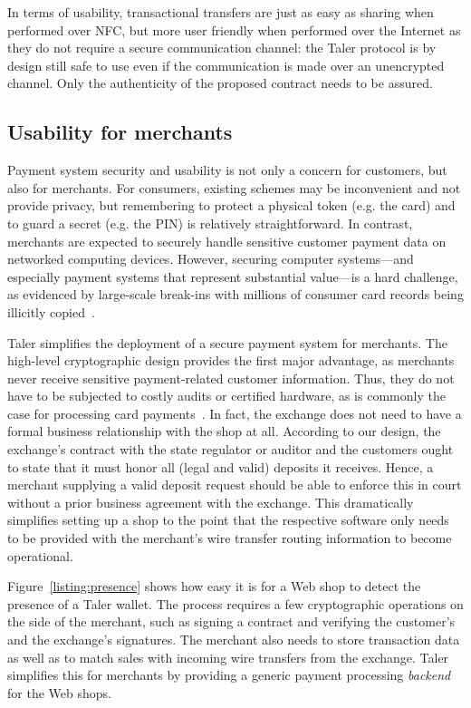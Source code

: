 \documentclass{llncs}
\begin{document}
In terms of usability, transactional
transfers are just as easy as sharing when performed over NFC, but
more user friendly when performed over the Internet as they do not
require a secure communication channel: the Taler protocol is by
design still safe to use even if the communication is made over an
unencrypted channel. Only the authenticity of the proposed contract
needs to be assured.


\subsection{Usability for merchants}

Payment system security and usability is not only a concern for
customers, but also for merchants.  For consumers, existing schemes
may be inconvenient and not provide privacy, but remembering to
protect a physical token (e.g. the card) and to guard a secret
(e.g. the PIN) is relatively straightforward.  In contrast, merchants
are expected to securely handle sensitive customer payment data on
networked computing devices.  However, securing computer systems---and
especially payment systems that represent substantial value---is a
hard challenge, as evidenced by large-scale break-ins with millions of
consumer card records being illicitly copied~\cite{target}.

Taler simplifies the deployment of a secure payment system for
merchants. The high-level cryptographic design
provides the first major advantage, as merchants never
receive sensitive payment-related customer information.  Thus, they do
not have to be subjected to costly audits or certified hardware, as is
commonly the case for processing card payments~\cite{pcidss}. In fact,
the exchange does not need to have a formal business relationship with
the shop at all.  According to our design, the exchange's contract
with the state regulator or auditor and the customers ought to state
that it must honor all (legal and valid) deposits it receives.  Hence,
a merchant supplying a valid deposit request should be able to enforce
this in court without a prior business agreement with the exchange.
This dramatically simplifies setting up a shop to the point that the
respective software only needs to be provided with the merchant's wire
transfer routing information to become operational.

Figure~\ref{listing:presence} shows how easy it is for a Web shop to
detect the presence of a Taler wallet.  The process requires a few
cryptographic operations on the side of the merchant, such as signing
a contract and verifying the customer's and the exchange's signatures.
The merchant also needs to store transaction data as well as to match
sales with incoming wire transfers from the exchange.  Taler
simplifies this for merchants by providing a generic payment
processing {\em backend} for the Web shops.
\end{document}
